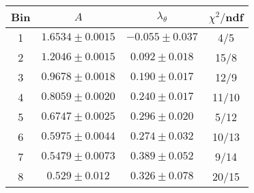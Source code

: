 \begin{tabular}{c|c|c|c}
Bin & $A$ & $\lambda_\theta$ & $\chi^2/$ndf \\
\hline
1 & $1.6534\pm0.0015$ & $-0.055\pm0.037$ & 4/5 \\
2 & $1.2046\pm0.0015$ & $0.092\pm0.018$ & 15/8 \\
3 & $0.9678\pm0.0018$ & $0.190\pm0.017$ & 12/9 \\
4 & $0.8059\pm0.0020$ & $0.240\pm0.017$ & 11/10 \\
5 & $0.6747\pm0.0025$ & $0.296\pm0.020$ & 5/12 \\
6 & $0.5975\pm0.0044$ & $0.274\pm0.032$ & 10/13 \\
7 & $0.5479\pm0.0073$ & $0.389\pm0.052$ & 9/14 \\
8 & $0.529\pm0.012$ & $0.326\pm0.078$ & 20/15 \\
\end{tabular}

